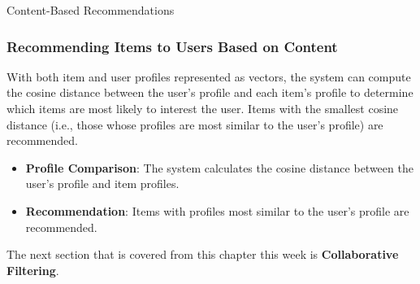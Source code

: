 \begin{notes}{Content-Based Recommendations}
    \subsubsection*{Recommending Items to Users Based on Content}
    
    With both item and user profiles represented as vectors, the system can compute the cosine distance between the user's profile and each item's profile to determine which items are most likely to interest 
    the user. Items with the smallest cosine distance (i.e., those whose profiles are most similar to the user's profile) are recommended.
    
    \begin{highlight}
        \begin{itemize}
            \item \textbf{Profile Comparison}: The system calculates the cosine distance between the user's profile and item profiles.
            \item \textbf{Recommendation}: Items with profiles most similar to the user's profile are recommended.
        \end{itemize}
    \end{highlight}
\end{notes}

The next section that is covered from this chapter this week is \textbf{Collaborative Filtering}.

